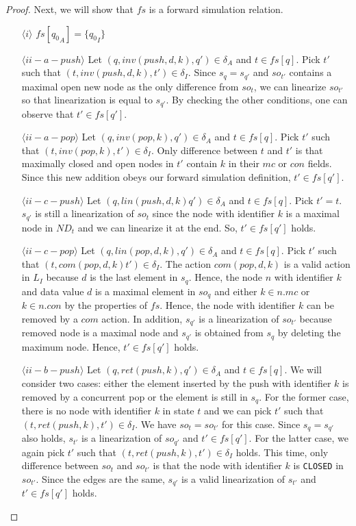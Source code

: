 \begin{proof}
Next, we will show that $fs$ is a forward simulation relation.
\begin{itemize}
\item[$\langle i \rangle$] $fs[{q_0}_A] = \{{q_0}_I\}
$ 
\item[$\langle ii-a-push \rangle$] Let $(q, inv(push,d,k), q') \in \delta_A$ and $t \in fs[q]$. Pick $t'$ such that $(t, inv(push,d,k), t') \in \delta_I$. Since $s_q=s_{q'}$ and $so_{t'}$ contains a maximal open new node as the only difference from $so_t$, we can linearize $so_{t'}$ so that linearization is equal to $s_{q'}$. By checking the other conditions, one can observe that $t' \in fs[q']$.
\item[$\langle ii-a-pop \rangle$] Let $(q, inv(pop,k), q') \in \delta_A$ and $t \in fs[q]$. Pick $t'$ such that $(t, inv(pop,k), t') \in \delta_I$. Only difference between $t$ and $t'$ is that maximally closed and open nodes in $t'$ contain $k$ in their $mc$ or $con$ fields. Since this new addition obeys our forward simulation definition, $t' \in fs[q']$.
\item[$\langle ii-c-push \rangle$] Let $(q, lin(push,d,k) q') \in \delta_A$ and $t \in fs[q]$. Pick $t'=t$. $s_{q'}$ is still a linearization of $so_t$ since the node with identifier $k$ is a maximal node in $ND_t$ and we can linearize it at the end. So, $t' \in fs[q']$ holds.
\item[$\langle ii-c-pop \rangle$] Let $(q, lin(pop,d,k), q') \in \delta_A$ and $t \in fs[q]$. Pick $t'$ such that $(t, com(pop,d,k) t') \in \delta_I$. The action $com(pop,d,k)$ is a valid action in $L_I$ because $d$ is the last element in $s_q$. Hence, the node $n$ with identifier $k$ and data value $d$ is a maximal element in $so_q$ and either $k \in n.mc$ or $k \in n.con$ by the properties of $fs$. Hence, the node with identifier $k$ can be removed by a $com$ action. In addition, $s_{q'}$ is a linearization of $so_{t'}$ because removed node is a maximal node and $s_{q'}$ is obtained from $s_q$ by deleting the maximum node. Hence, $t' \in fs[q']$ holds.
\item[$\langle ii-b-push \rangle$] Let $(q, ret(push,k), q') \in \delta_A$ and $t \in fs[q]$. We will consider two cases: either the element inserted by the push with identifier $k$ is removed by a concurrent pop or the element is still in $s_q$. For the former case, there is no node with identifier $k$  in state $t$ and we can pick $t'$ such that $(t, ret(push,k), t') \in \delta_I$. We have $so_t = so_{t'}$ for this case. Since $s_q = s_{q'}$ also holds, $s_{t'}$ is a linearization of $so_{q'}$ and $t' \in fs[q']$. For the latter case, we again pick $t'$ such that $(t, ret(push,k), t') \in \delta_I$ holds. This time, only difference between $so_t$ and $so_{t'}$ is that the node with identifier $k$ is \texttt{CLOSED} in $so_{t'}$. Since the edges are the same, $s_{q'}$ is a valid linearization of $s_{t'}$ and $t' \in fs[q']$ holds. 

\end{itemize}
\end{proof}
